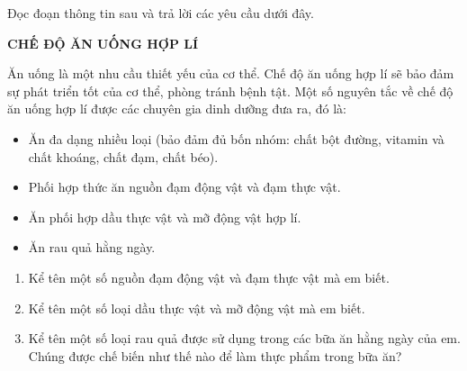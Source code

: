 \documentclass[Main.tex]{subfiles}
\begin{document}
\begin{bt}%
	Đọc đoạn thông tin sau và trả lời các yêu cầu dưới đây.
	\begin{center}
		\textbf{CHẾ ĐỘ ĂN UỐNG HỢP LÍ}
	\end{center}
	Ăn uống là một nhu cầu thiết yếu của cơ thể. Chế độ ăn uống hợp lí sẽ bảo đảm sự phát triển tốt của cơ thể, phòng tránh bệnh tật. Một số nguyên tắc về chế độ ăn uống hợp lí được các chuyên gia dinh dưỡng đưa ra, đó là:
	\begin{itemize}
		\item Ăn đa dạng nhiều loại (bảo đảm đủ bốn nhóm: chất bột đường, vitamin và chất khoáng, chất đạm, chất béo).
		\item Phối hợp thức ăn nguồn đạm động vật và đạm thực vật.
		\item Ăn phối hợp dầu thực vật và mỡ động vật hợp lí.
		\item Ăn rau quả hằng ngày.
	\end{itemize}
	\begin{enumerate}
		\item[(a)] Kể tên một số nguồn đạm động vật và đạm thực vật mà em biết.
		\item[(b)] Kể tên một số loại dầu thực vật và mỡ động vật mà em biết.
		\item[(c)] Kể tên một số loại rau quả được sử dụng trong các bữa ăn hằng ngày của em. Chúng được chế biến như thế nào để làm thực phẩm trong bữa ăn?
	\end{enumerate}
\end{bt}
\end{document}
